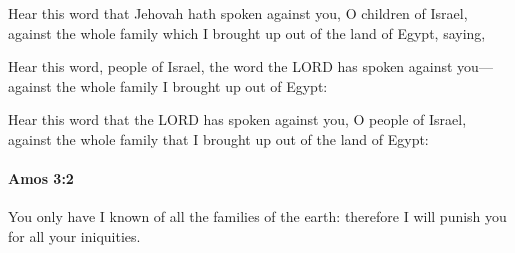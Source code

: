 			\begin{versebox}
					\item[BHS] 
					\item[LXX] 
					\item[ASV] Hear this word that Jehovah hath spoken against you, O children of Israel, against the whole family which I brought up out of the land of Egypt, saying,
					\item[NIV] Hear this word, people of Israel, the word the LORD has spoken against you—against the whole family I brought up out of Egypt:
					\item[NRSV] Hear this word that the LORD has spoken against you, O people of Israel, against the whole family that I brought up out of the land of Egypt:
			\end{versebox}

		\paragraph{Amos 3:2} %
			\label{AMOS-3-2}

			You only have I known of all the families of the earth: therefore I will punish you for all your iniquities.

